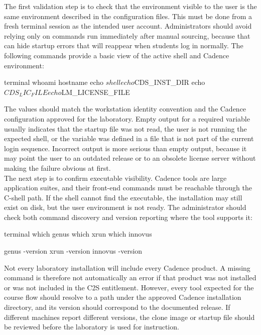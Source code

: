 \noindent The first validation step is to check that the environment visible to the user is the same
environment described in the configuration files. This must be done from a fresh terminal session as
the intended user account. Administrators should avoid relying only on commands run immediately
after manual sourcing, because that can hide startup errors that will reappear when students log in
normally. The following commands provide a basic view of the active shell and Cadence environment:

\begin{codeblock}{terminal}
whoami
hostname
echo $shell
echo $CDS_INST_DIR
echo $CDS_LIC_FILE
echo $LM_LICENSE_FILE
\end{codeblock}

\noindent The values should match the workstation identity convention and the Cadence configuration
approved for the laboratory. Empty output for a required variable usually indicates that the startup
file was not read, the user is not running the expected shell, or the variable was defined in a file
that is not part of the current login sequence. Incorrect output is more serious than empty output,
because it may point the user to an outdated release or to an obsolete license server without making
the failure obvious at first.\\

\noindent The next step is to confirm executable visibility. Cadence tools are large application
suites, and their front-end commands must be reachable through the C-shell path. If the shell cannot
find the executable, the installation may still exist on disk, but the user environment is not ready.
The administrator should check both command discovery and version reporting where the tool supports
it:

\begin{codeblock}{terminal}
which genus
which xrun
which innovus

genus -version
xrun -version
innovus -version
\end{codeblock}

\noindent Not every laboratory installation will include every Cadence product. A missing command is
therefore not automatically an error if that product was not installed or was not included in the
C2S entitlement. However, every tool expected for the course flow should resolve to a path under the
approved Cadence installation directory, and its version should correspond to the documented release.
If different machines report different versions, the clone image or startup file should be reviewed
before the laboratory is used for instruction.\\

